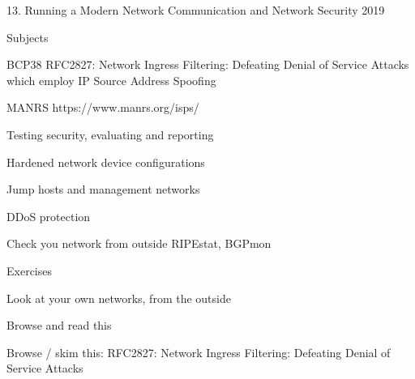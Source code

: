 \documentclass[Screen16to9,17pt]{foils}
\begin{document}
\mytitlepage
{13. Running a Modern Network}
{Communication and Network Security 2019}



\begin{list1}
\item Subjects
\begin{list2}
\item BCP38 RFC2827: Network Ingress Filtering: Defeating Denial of Service Attacks which employ IP Source Address Spoofing
\item MANRS https://www.manrs.org/isps/
\item Testing security, evaluating and reporting
\item Hardened network device configurations
\item Jump hosts and management networks
\item DDoS protection
\item Check you network from outside RIPEstat, BGPmon
\end{list2}
\item Exercises
\begin{list2}
\item Look at your own networks, from the outside
\end{list2}
\end{list1}




\begin{list1}
\item Browse   and read this\\ 
\item Browse / skim this:
RFC2827: Network Ingress Filtering: Defeating Denial of Service Attacks
\end{list1}




\end{document}
